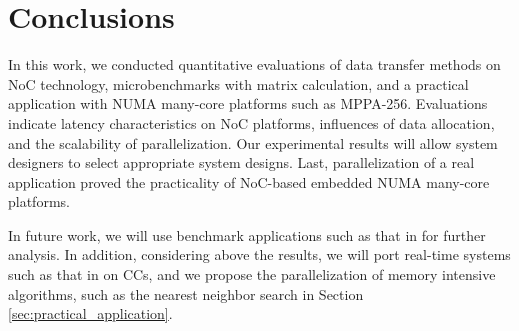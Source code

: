 \chapter{Conclusions}
\label{chap:conclusion}
In this work, we conducted quantitative evaluations of data transfer methods on NoC technology, microbenchmarks with matrix calculation, and a practical application with NUMA many-core platforms such as MPPA-256.
Evaluations indicate latency characteristics on NoC platforms, influences of data allocation, and the scalability of parallelization.
Our experimental results will allow system designers to select appropriate system designs.
Last, parallelization of a real application proved the practicality of NoC-based embedded NUMA many-core platforms.

In future work, we will use benchmark applications such as that in \cite{che2010characterization} for further analysis.
In addition, considering above the results, we will port real-time systems such as that in \cite{maruyama2016ros2} on CCs, and we propose the parallelization of memory intensive algorithms, such as the nearest neighbor search in Section \ref{sec:practical_application}.







% 
% 

% 

